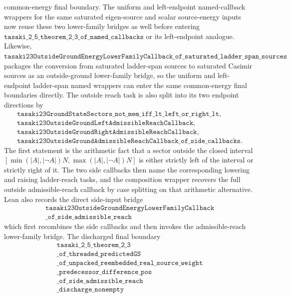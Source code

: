 \documentclass[a4paper,11pt]{article}
\begin{document}
common-energy final boundary.
The uniform and left-endpoint named-callback wrappers for the same saturated
eigen-source and scalar source-energy inputs now reuse these two lower-family
bridges as well before entering
\(\texttt{tasaki\_2\_5\_theorem\_2\_3\_of\_named\_callbacks}\) or its
left-endpoint analogue.
Likewise,
\(\texttt{tasaki23OutsideGroundEnergyLowerFamilyCallback\_of\_saturated\_ladder\_span\_sources}\)
packages the conversion from saturated ladder-span sources to saturated
Casimir sources as an outside-ground lower-family bridge, so the uniform and
left-endpoint ladder-span named wrappers can enter the same common-energy
final boundaries directly.
The outside reach task is also split into its
two endpoint directions by
\[
\begin{gathered}
\texttt{tasaki23GroundStateSectors\_not\_mem\_iff\_lt\_left\_or\_right\_lt},\\
\texttt{tasaki23OutsideGroundLeftAdmissibleReachCallback},\\
\texttt{tasaki23OutsideGroundRightAdmissibleReachCallback},\\
\texttt{tasaki23OutsideGroundAdmissibleReachCallback\_of\_side\_callbacks}.
\end{gathered}
\]
The first statement is the arithmetic fact that a sector outside the
closed interval
\([\min(|A|,|\neg A|)N,\max(|A|,|\neg A|)N]\) is either strictly left of
the interval or strictly right of it.  The two side callbacks then name
the corresponding lowering and raising ladder-reach tasks, and the
composition wrapper recovers the full outside admissible-reach callback
by case splitting on that arithmetic alternative.  Lean also records the
direct side-input bridge
\[
\begin{gathered}
\texttt{tasaki23OutsideGroundEnergyLowerFamilyCallback}\\
\texttt{\_of\_side\_admissible\_reach}
\end{gathered}
\]
which first recombines the side callbacks and then invokes the
admissible-reach lower-family bridge.  The discharged final boundary
\[
\begin{gathered}
\texttt{tasaki\_2\_5\_theorem\_2\_3}\\
\texttt{\_of\_threaded\_predictedGS}\\
\texttt{\_of\_unpacked\_reembedded\_real\_source\_weight}\\
\texttt{\_predecessor\_difference\_pos}\\
\texttt{\_of\_side\_admissible\_reach}\\
\texttt{\_discharge\_nonempty}
\end{gathered}
\]
\end{document}
